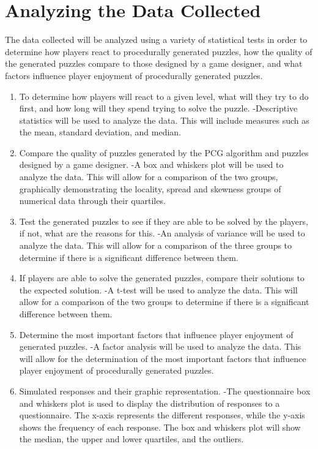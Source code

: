 \documentclass[lettersize,journal]{IEEEtran}
\begin{document}
\section {Analyzing the Data Collected}

The data collected will be analyzed using a variety of statistical tests in order to determine how players react to procedurally generated puzzles, how the quality of the generated puzzles compare to those designed by a game designer, and what factors influence player enjoyment of procedurally generated puzzles.
\begin{enumerate}
\item To determine how players will react to a given level, what will they try to do first, and how long will they spend trying to solve the puzzle.
-Descriptive statistics will be used to analyze the data. This will include measures such as the mean, standard deviation, and median.

\item Compare the quality of puzzles generated by the PCG algorithm and puzzles designed by a game designer.
-A box and whiskers plot will be used to analyze the data. This will allow for a comparison of the two groups, graphically demonstrating the locality, spread and skewness groups of numerical data through their quartiles.

\item Test the generated puzzles to see if they are able to be solved by the players, if not, what are the reasons for this.
-An analysis of variance will be used to analyze the data. This will allow for a comparison of the three groups to determine if there is a significant difference between them.

\item If players are able to solve the generated puzzles, compare their solutions to the expected solution.
-A t-test will be used to analyze the data. This will allow for a comparison of the two groups to determine if there is a significant difference between them.

\item Determine the most important factors that influence player enjoyment of generated puzzles.
-A factor analysis will be used to analyze the data. This will allow for the determination of the most important factors that influence player enjoyment of procedurally generated puzzles.

\item Simulated responses and their graphic representation.
-The questionnaire box and whiskers plot is used to display the distribution of responses to a questionnaire. The x-axis represents the different responses, while the y-axis shows the frequency of each response. The box and whiskers plot will show the median, the upper and lower quartiles, and the outliers.
\end{enumerate}
\end{document}
